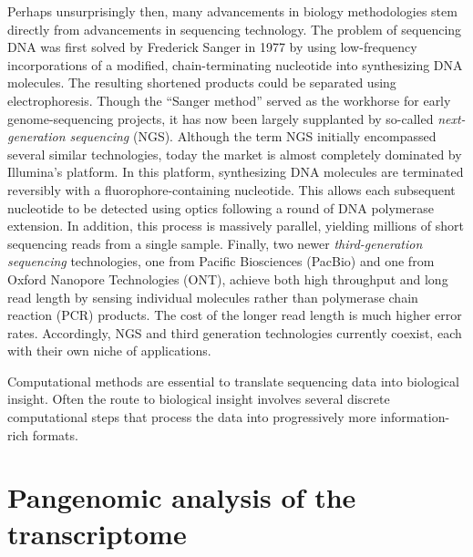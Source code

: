 \documentclass[11pt]{ucthesis}
\begin{document}
Perhaps unsurprisingly then, many advancements in biology methodologies stem directly from advancements in sequencing technology. The problem of sequencing DNA was first solved by Frederick Sanger in 1977 by using low-frequency incorporations of a modified, chain-terminating nucleotide into synthesizing DNA molecules. The resulting shortened products could be separated using electrophoresis. Though the ``Sanger method'' served as the workhorse for early genome-sequencing projects, it has now been largely supplanted by so-called \emph{next-generation sequencing} (NGS). Although the term NGS initially encompassed several similar technologies, today the market is almost completely dominated by Illumina's platform. In this platform, synthesizing DNA molecules are terminated reversibly with a fluorophore-containing nucleotide. This allows each subsequent nucleotide to be detected using optics following a round of DNA polymerase extension. In addition, this process is massively parallel, yielding millions of short sequencing reads from a single sample. Finally, two newer \emph{third-generation sequencing} technologies, one from Pacific Biosciences (PacBio) and one from Oxford Nanopore Technologies (ONT), achieve both high throughput and long read length by sensing individual molecules rather than polymerase chain reaction (PCR) products. The cost of the longer read length is much higher error rates. Accordingly, NGS and third generation technologies currently coexist, each with their own niche of applications.

Computational methods are essential to translate sequencing data into biological insight. Often the route to biological insight involves several discrete computational steps that process the data into progressively more information-rich formats. 




%
%
%
%
%


\part{Pangenomic analysis of the transcriptome}
\end{document}
